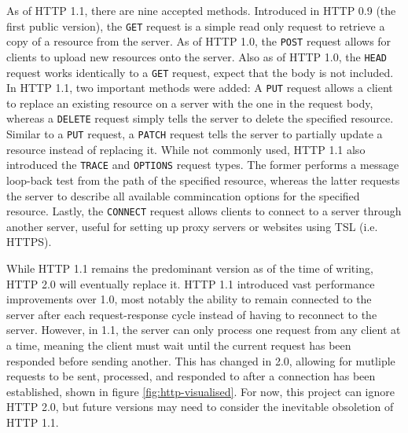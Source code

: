 \documentclass[11pt]{article}
\begin{document}
As of HTTP 1.1, there are nine accepted methods. Introduced in HTTP 0.9 (the first public version), the \texttt{GET} request is a simple read only request to retrieve a copy of a resource from the server. As of HTTP 1.0, the \texttt{POST} request allows for clients to upload new resources onto the server. Also as of HTTP 1.0, the \texttt{HEAD} request works identically to a \texttt{GET} request, expect that the body is not included. In HTTP 1.1, two important methods were added: A \texttt{PUT} request allows a client to replace an existing resource on a server with the one in the request body, whereas a \texttt{DELETE} request simply tells the server to delete the specified resource. Similar to a \texttt{PUT} request, a \texttt{PATCH} request tells the server to partially update a resource instead of replacing it. While not commonly used, HTTP 1.1 also introduced the \texttt{TRACE} and \texttt{OPTIONS} request types. The former performs a message loop-back test from the path of the specified resource, whereas the latter requests the server to describe all available commincation options for the specified resource. Lastly, the \texttt{CONNECT} request allows clients to connect to a server through another server, useful for setting up proxy servers or websites using TSL (i.e. HTTPS).

While HTTP 1.1 remains the predominant version as of the time of writing, HTTP 2.0 will eventually replace it. HTTP 1.1 introduced vast performance improvements over 1.0, most notably the ability to remain connected to the server after each request-response cycle instead of having to reconnect to the server. However, in 1.1, the server can only process one request from any client at a time, meaning the client must wait until the current request has been responded before sending another. This has changed in 2.0, allowing for mutliple requests to be sent, processed, and responded to after a connection has been established, shown in figure \ref{fig:http-visualised}. For now, this project can ignore HTTP 2.0, but future versions may need to consider the inevitable obsoletion of HTTP 1.1.
\end{document}
